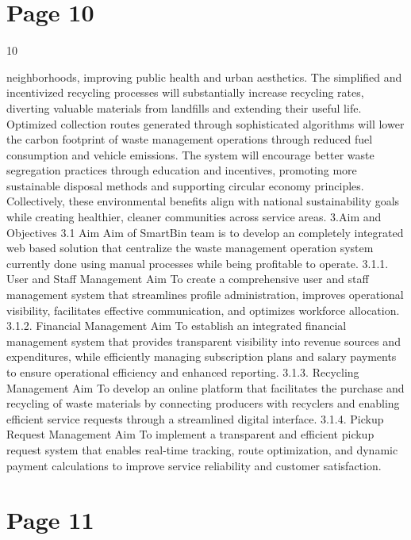 \documentclass{article}
\begin{document}
\section*{Page 10}
   
 
 10  
 
neighborhoods, improving public health and urban aesthetics. The simplified and 
incentivized recycling processes will substantially increase recycling rates, diverting 
valuable materials from landfills and extending their useful life. Optimized collection 
routes generated through sophisticated algorithms will lower the carbon footprint of 
waste management operations through reduced fuel consumption and vehicle 
emissions. The system will encourage better waste segregation practices through 
education and incentives, promoting more sustainable disposal methods and supporting 
circular economy principles. Collectively, these environmental benefits align with 
national sustainability goals while creating healthier, cleaner communities across service 
areas. 
3.Aim and Objectives 
3.1 Aim 
Aim of SmartBin team is to develop an completely integrated web based solution that 
centralize the waste management operation system currently done using manual 
processes while being profitable to operate.  
    3.1.1. User and Staff Management Aim 
To create a comprehensive user and staff management system that streamlines profile 
administration, improves operational visibility, facilitates effective communication, and 
optimizes workforce allocation. 
    3.1.2. Financial Management Aim 
To establish an integrated financial management system that provides transparent 
visibility into revenue sources and expenditures, while efficiently managing subscription 
plans and salary payments to ensure operational efficiency and enhanced reporting. 
    3.1.3. Recycling Management Aim 
To develop an online platform that facilitates the purchase and recycling of waste 
materials by connecting producers with recyclers and enabling efficient service requests 
through a streamlined digital interface. 
    3.1.4. Pickup Request Management Aim 
To implement a transparent and efficient pickup request system that enables real-time 
tracking, route optimization, and dynamic payment calculations to improve service 
reliability and customer satisfaction. 
 

\section*{Page 11}
   
\end{document}
